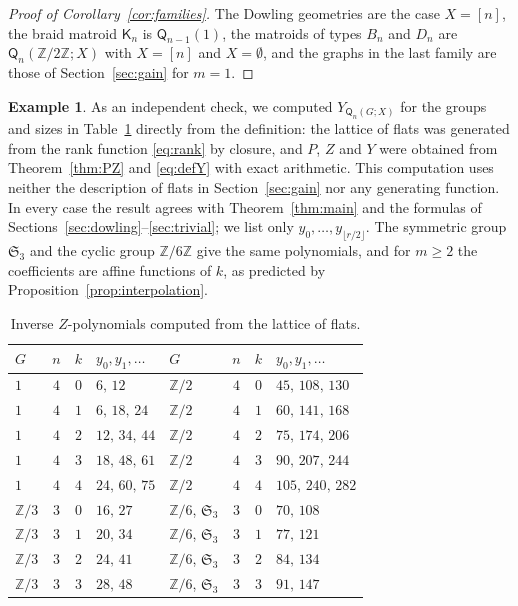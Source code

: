 \documentclass[11pt]{amsart}
\theoremstyle{definition}
\newtheorem{example}[theorem]{Example}
\theoremstyle{remark}
\numberwithin{equation}{section}
\newcommand{\Q}{\mathsf{Q}}
\newcommand{\K}{\mathsf{K}}
\begin{document}
\begin{proof}[Proof of Corollary~\textup{\ref{cor:families}}]
The Dowling geometries are the case $X=[n]$, the braid matroid $\K_n$ is $\Q_{n-1}(1)$, the matroids of types $B_n$ and $D_n$ are $\Q_n(\mathbb{Z}/2\mathbb{Z};X)$ with $X=[n]$ and $X=\emptyset$, and the graphs in the last family are those of Section~\ref{sec:gain} for $m=1$.
\end{proof}

\begin{example}\label{ex:table}
As an independent check, we computed $Y_{\Q_n(G;X)}$ for the groups and sizes in Table~\ref{tab:direct} directly from the definition: the lattice of flats was generated from the rank function \eqref{eq:rank} by closure, and $P$, $Z$ and $Y$ were obtained from Theorem~\ref{thm:PZ} and \eqref{eq:defY} with exact arithmetic. This computation uses neither the description of flats in Section~\ref{sec:gain} nor any generating function. In every case the result agrees with Theorem~\ref{thm:main} and the formulas of Sections~\ref{sec:dowling}--\ref{sec:trivial}; we list only $y_0,\dots,y_{\lfloor r/2\rfloor}$. The symmetric group $\mathfrak S_3$ and the cyclic group $\mathbb{Z}/6\mathbb{Z}$ give the same polynomials, and for $m\ge2$ the coefficients are affine functions of $k$, as predicted by Proposition~\ref{prop:interpolation}.
\end{example}

\begin{table}[H]
\centering
\caption{Inverse $Z$-polynomials computed from the lattice of flats.}\label{tab:direct}
\vspace{6pt}
\begin{tabular}{@{}lccl@{\qquad}lccl@{}}
\toprule
$G$ & $n$ & $k$ & $y_0,y_1,\dots$ & $G$ & $n$ & $k$ & $y_0,y_1,\dots$\\
\midrule
$1$ & $4$ & $0$ & $6,\,12$ & $\mathbb{Z}/2$ & $4$ & $0$ & $45,\,108,\,130$\\
$1$ & $4$ & $1$ & $6,\,18,\,24$ & $\mathbb{Z}/2$ & $4$ & $1$ & $60,\,141,\,168$\\
$1$ & $4$ & $2$ & $12,\,34,\,44$ & $\mathbb{Z}/2$ & $4$ & $2$ & $75,\,174,\,206$\\
$1$ & $4$ & $3$ & $18,\,48,\,61$ & $\mathbb{Z}/2$ & $4$ & $3$ & $90,\,207,\,244$\\
$1$ & $4$ & $4$ & $24,\,60,\,75$ & $\mathbb{Z}/2$ & $4$ & $4$ & $105,\,240,\,282$\\
\midrule
$\mathbb{Z}/3$ & $3$ & $0$ & $16,\,27$ & $\mathbb{Z}/6$, $\mathfrak S_3$ & $3$ & $0$ & $70,\,108$\\
$\mathbb{Z}/3$ & $3$ & $1$ & $20,\,34$ & $\mathbb{Z}/6$, $\mathfrak S_3$ & $3$ & $1$ & $77,\,121$\\
$\mathbb{Z}/3$ & $3$ & $2$ & $24,\,41$ & $\mathbb{Z}/6$, $\mathfrak S_3$ & $3$ & $2$ & $84,\,134$\\
$\mathbb{Z}/3$ & $3$ & $3$ & $28,\,48$ & $\mathbb{Z}/6$, $\mathfrak S_3$ & $3$ & $3$ & $91,\,147$\\
\bottomrule
\end{tabular}
\end{table}
\end{document}
